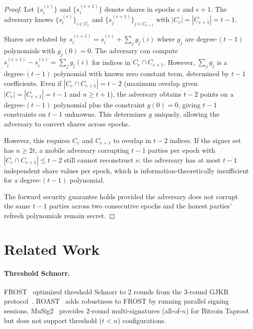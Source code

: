 \documentclass[11pt,twocolumn]{article}
\begin{document}
\begin{proof}
Let $\{s_i^{(e)}\}$ and $\{s_i^{(e+1)}\}$ denote shares in epochs $e$ and $e+1$.
The adversary knows $\{s_i^{(e)}\}_{i \in C_e}$ and $\{s_j^{(e+1)}\}_{j \in C_{e+1}}$
with $|C_e| = |C_{e+1}| = t-1$.

Shares are related by $s_i^{(e+1)} = s_i^{(e)} + \sum_j g_j(i)$ where $g_j$ are
degree-$(t-1)$ polynomials with $g_j(0) = 0$. The adversary can compute
$s_i^{(e+1)} - s_i^{(e)} = \sum_j g_j(i)$ for indices in $C_e \cap C_{e+1}$.
However, $\sum_j g_j$ is a degree-$(t-1)$ polynomial with known zero constant term,
determined by $t-1$ coefficients. Even if $|C_e \cap C_{e+1}| = t-2$ (maximum overlap
given $|C_e| = |C_{e+1}| = t-1$ and $n \geq t+1$), the adversary obtains $t-2$ points
on a degree-$(t-1)$ polynomial plus the constraint $g(0) = 0$, giving $t-1$
constraints on $t-1$ unknowns. This determines $g$ uniquely, allowing the adversary
to convert shares across epochs.

However, this requires $C_e$ and $C_{e+1}$ to overlap in $t-2$ indices. If the signer
set has $n \geq 2t$, a mobile adversary corrupting $t-1$ parties per epoch with
$|C_e \cap C_{e+1}| \leq t-2$ still cannot reconstruct $s$: the adversary has at most
$t-1$ independent share values per epoch, which is information-theoretically
insufficient for a degree-$(t-1)$ polynomial.

The forward security guarantee holds provided the adversary does not corrupt the same
$t-1$ parties across two consecutive epochs and the honest parties' refresh polynomials
remain secret.
\end{proof}

\section{Related Work}
\label{sec:related}

\paragraph{Threshold Schnorr.}
FROST~\cite{komlo2020frost} optimized threshold Schnorr to 2 rounds from the 3-round
GJKR protocol~\cite{gennaro2003}. ROAST~\cite{ruffing2022roast} adds robustness to
FROST by running parallel signing sessions. MuSig2~\cite{nick2021musig2} provides
2-round multi-signatures (all-of-$n$) for Bitcoin Taproot but does not support
threshold ($t < n$) configurations.
\end{document}
